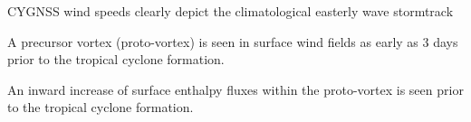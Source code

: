 \documentclass[draft]{agujournal2019}
\begin{document}





\begin{keypoints}
\item CYGNSS wind speeds clearly depict the climatological easterly wave stormtrack

\item  A precursor vortex (proto-vortex) is seen in surface wind fields as early as 3 days prior to the tropical cyclone formation.

\item An inward increase of surface enthalpy fluxes within the proto-vortex is seen prior to the tropical cyclone formation. 



\end{keypoints}

%
%

%
%
\end{document}
